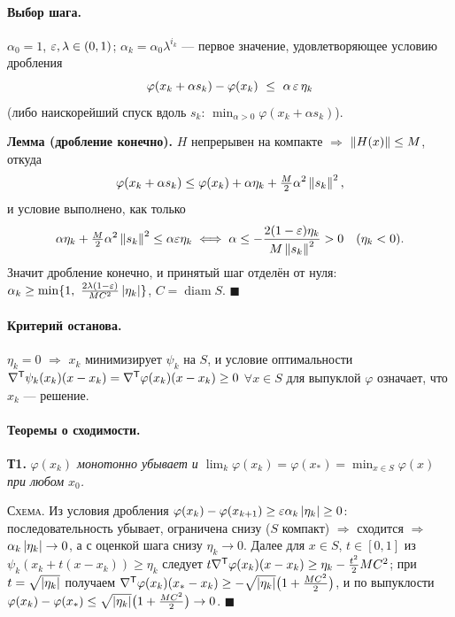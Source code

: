 \paragraph{Выбор шага.}
$\alpha_0 = 1$, $\varepsilon, \lambda \in (0,1)$; $\alpha_k = \alpha_0\lambda^{i_k}$ —
первое значение, удовлетворяющее условию дробления
\[
  \varphi(x_k + \alpha s_k) - \varphi(x_k) \ \le\ \alpha\,\eps\,\eta_k
\]
(либо наискорейший спуск вдоль $s_k$: $\min_{\alpha>0}\varphi(x_k+\alpha s_k)$).

\textbf{Лемма (дробление конечно).} $H$ непрерывен на компакте $\Rightarrow$
$\left\lVert H(x) \right\rVert \le M$, откуда
\[
  \varphi(x_k + \alpha s_k) \le \varphi(x_k) + \alpha\eta_k
    + \tfrac{M}{2}\alpha^2\left\lVert s_k \right\rVert^2 ,
\]
и условие выполнено, как только
\[
  \alpha\eta_k + \tfrac{M}{2}\alpha^2\left\lVert s_k \right\rVert^2 \le \alpha\varepsilon\eta_k
  \iff
  \alpha \le -\frac{2(1-\varepsilon)\eta_k}{M\left\lVert s_k \right\rVert^2} > 0 \quad (\eta_k < 0) .
\]
Значит дробление конечно, и принятый шаг отделён от нуля:
$\alpha_k \ge \min\{1,\ \tfrac{2\lambda(1-\eps)}{MC^2}\abs{\eta_k}\}$,
$C = \operatorname{diam}S$. $\blacksquare$

\paragraph{Критерий останова.}
$\eta_k = 0$ $\Rightarrow$ $x_k$ минимизирует $\psi_k$ на $S$, и условие
оптимальности $\nabla^{\mathsf{T}}\psi_k(x_k)(x - x_k) = \nabla^{\mathsf{T}}\varphi(x_k)(x-x_k) \ge 0$
$\forall x \in S$ для выпуклой $\varphi$ означает, что $x_k$ — решение.

\paragraph{Теоремы о сходимости.}
\textbf{Т1.} \textit{$\varphi(x_k)$ монотонно убывает и
$\lim_k \varphi(x_k) = \varphi(x_*) = \min_{x\in S}\varphi(x)$ при любом $x_0$.}

\textsc{Схема.} Из условия дробления
$\varphi(x_k) - \varphi(x_{k+1}) \ge \varepsilon\alpha_k\left\lvert \eta_k \right\rvert \ge 0$:
последовательность убывает, ограничена снизу ($S$ компакт) $\Rightarrow$
сходится $\Rightarrow$ $\alpha_k\left\lvert \eta_k \right\rvert \to 0$, а с оценкой шага снизу
$\eta_k \to 0$. Далее для $x \in S$, $t \in [0,1]$ из $\psi_k(x_k+t(x-x_k)) \ge \eta_k$
следует $t\nabla^{\mathsf{T}}\varphi(x_k)(x-x_k) \ge \eta_k - \tfrac{t^2}{2}MC^2$; при
$t = \sqrt{\left\lvert \eta_k \right\rvert}$ получаем
$\nabla^{\mathsf{T}}\varphi(x_k)(x_* - x_k) \ge -\sqrt{\left\lvert \eta_k \right\rvert}\big(1+\tfrac{MC^2}{2}\big)$,
и по выпуклости
$\varphi(x_k) - \varphi(x_*) \le \sqrt{\left\lvert \eta_k \right\rvert}\big(1+\tfrac{MC^2}{2}\big) \to 0$.
$\blacksquare$

